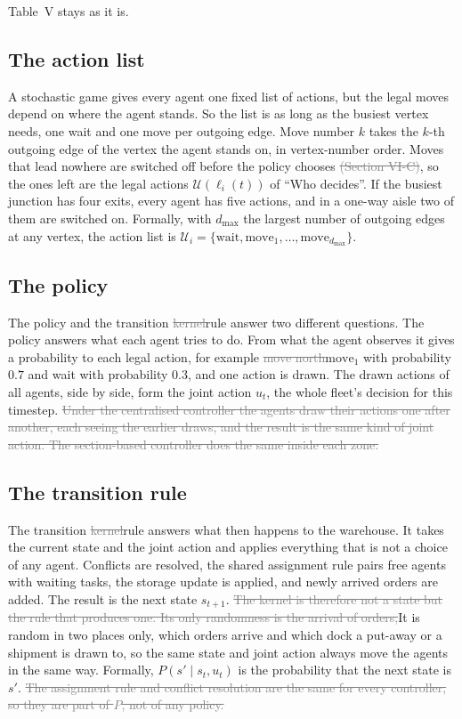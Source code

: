 \documentclass[11pt,a4paper]{article}
\newcommand{\new}[1]{\textcolor{newc}{#1}}
\newcommand{\old}[1]{\textcolor{gray}{\sout{#1}}}
\begin{document}
Table~V stays as it is.

\subsection*{The action list}
A stochastic game gives every agent one fixed list of actions, but the legal
moves depend on where the agent stands. So the list is as long as the busiest
vertex needs, one wait and one move per outgoing edge. Move number $k$ takes
the $k$-th outgoing edge of the vertex the agent stands on, in vertex-number
order. Moves that lead nowhere are switched off before the policy chooses
\old{(Section VI-C)}\new{, so the ones left are the legal actions
$\mathcal{U}(\ell_i(t))$ of ``Who decides''}. If the busiest junction has four
exits, every agent has five actions, and in a one-way aisle two of them are
switched on. Formally, with $d_{\max}$ the largest number of outgoing edges at
any vertex, the action list is $\mathcal{U}_i = \{\mathrm{wait},
\mathrm{move}_1, \dots, \mathrm{move}_{d_{\max}}\}$.

\subsection*{The policy}
The policy and the transition \old{kernel}\new{rule} answer two different
questions. The policy answers what each agent tries to do. From what the agent
observes it gives a probability to each legal action, for example
\old{move north}\new{$\mathrm{move}_1$} with probability $0.7$ and wait with
probability $0.3$, and one action is drawn. The drawn actions of all agents,
side by side, form the joint action $u_t$, the whole fleet's decision for this
timestep. \old{Under the centralised controller the agents draw their actions
one after another, each seeing the earlier draws, and the result is the same
kind of joint action. The section-based controller does the same inside each
zone.}

\subsection*{The transition rule}
The transition \old{kernel}\new{rule} answers what then happens to the
warehouse. It takes the current state and the joint action and applies
everything that is not a choice of any agent. Conflicts are resolved, the
shared assignment rule pairs free agents with waiting tasks, the storage
update is applied, and newly arrived orders are added. The result is the next
state $s_{t+1}$. \old{The kernel is therefore not a state but the rule that
produces one. Its only randomness is the arrival of orders,}\new{It is random
in two places only, which orders arrive and which dock a put-away or a
shipment is drawn to,} so the same state and joint action always move the
agents in the same way. Formally, $P(s' \mid s_t, u_t)$ is the probability
that the next state is $s'$. \old{The assignment rule and conflict resolution
are the same for every controller, so they are part of $P$, not of any
policy.}
\end{document}

